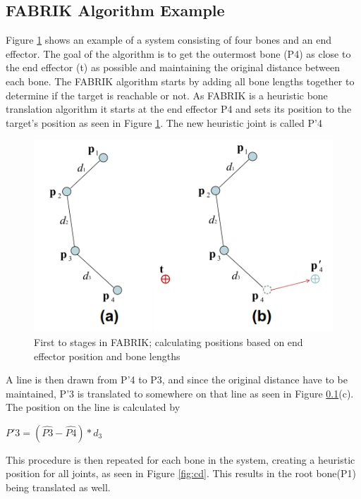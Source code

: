 \subsection{FABRIK Algorithm Example}

Figure \ref{fig:ab} shows an example of a system consisting of four bones and an end effector. The goal of the algorithm is to get the outermost bone (P4) as close to the end effector (t) as possible and maintaining the original distance between each bone. 
The FABRIK algorithm starts by adding all bone lengths together to determine if the target is reachable or not. 
As FABRIK is a heuristic bone translation algorithm it starts at the end effector P4 and sets its position to the target's position as seen in Figure \ref{fig:ab}. The new heuristic joint is called P'4 

\begin{figure}[hbtp]
\centering
\includegraphics[width=1\textwidth]{FABRIK/ab}
\caption{First to stages in FABRIK; calculating positions based on end effector position and bone lengths}
\label{fig:ab}
\end{figure}

A line is then drawn from P'4 to P3, and since the original distance have to be maintained, P'3 is translated to somewhere on that line as seen in Figure \ref{}(c). The position on the line is calculated by 

$P'3 = (\hat{P3} - \hat{P4}) * d_{3}$

This procedure is then repeated for each bone in the system, creating a heuristic position for all joints, as seen in Figure \ref{fig:cd}. This results in the root bone(P1) being translated as well. 

